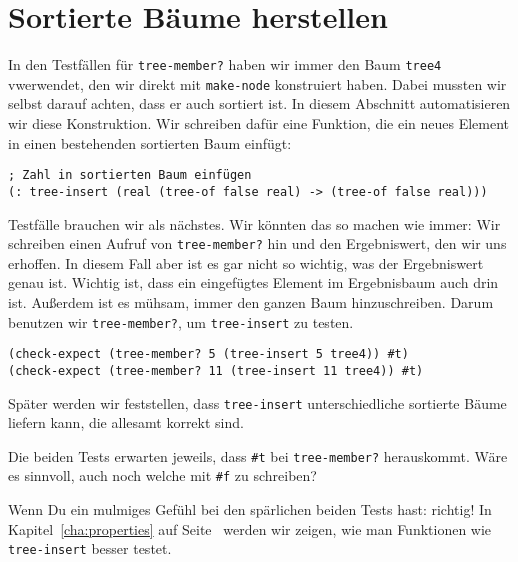 \section{Sortierte Bäume herstellen}

In den Testfällen für \lstinline{tree-member?} haben wir immer den
Baum \lstinline{tree4} vwerwendet, den wir direkt mit
\lstinline{make-node} konstruiert haben.  Dabei mussten wir selbst
darauf achten, dass er auch sortiert ist.  In diesem Abschnitt
automatisieren wir diese Konstruktion.
Wir schreiben dafür eine Funktion, die ein neues Element in einen
bestehenden sortierten Baum einfügt:
%
\begin{lstlisting}
; Zahl in sortierten Baum einfügen 
(: tree-insert (real (tree-of false real) -> (tree-of false real)))
\end{lstlisting}
%
Testfälle brauchen wir als nächstes.  Wir könnten das so machen wie
immer: Wir schreiben einen Aufruf von \lstinline{tree-member?} hin und
den Ergebniswert, den wir uns erhoffen.  In diesem Fall aber ist es
gar nicht so wichtig, was der Ergebniswert genau ist.  Wichtig ist,
dass ein eingefügtes Element im Ergebnisbaum auch drin ist.  Außerdem
ist es mühsam, immer den ganzen Baum hinzuschreiben.  Darum benutzen
wir \lstinline{tree-member?}, um \lstinline{tree-insert} zu testen.
%
\begin{lstlisting}
(check-expect (tree-member? 5 (tree-insert 5 tree4)) #t)
(check-expect (tree-member? 11 (tree-insert 11 tree4)) #t)
\end{lstlisting}
%
Später werden wir feststellen, dass \lstinline{tree-insert}
unterschiedliche sortierte Bäume liefern kann, die allesamt korrekt
sind.
%
\begin{aufgabeinline}
  Die beiden Tests erwarten jeweils, dass \lstinline{#t} bei
  \lstinline{tree-member?} herauskommt.  Wäre es sinnvoll, auch noch
  welche mit \lstinline{#f} zu schreiben?
\end{aufgabeinline}
%
Wenn Du ein mulmiges Gefühl bei den spärlichen beiden Tests hast:
richtig!  In Kapitel~\ref{cha:properties} auf
Seite~\pageref{cha:properties} werden wir zeigen, wie man Funktionen
wie \lstinline{tree-insert} besser testet.

